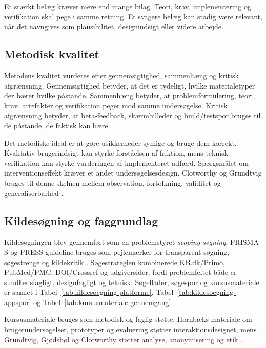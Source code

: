 Et stærkt belæg kræver mere end mange bilag. Teori, krav, implementering og verifikation skal pege i samme retning. Et svagere belæg kan stadig være relevant, når det navngives som plausibilitet, designindsigt eller videre arbejde.

\subsection{Metodisk kvalitet}

Metodens kvalitet vurderes efter gennemsigtighed, sammenhæng og kritisk afgrænsning. Gennemsigtighed betyder, at det er tydeligt, hvilke materialetyper der bærer hvilke påstande. Sammenhæng betyder, at problemformulering, teori, krav, artefakter og verifikation peger mod samme undersøgelse. Kritisk afgrænsning betyder, at beta-feedback, skærmbilleder og build/testspor bruges til de påstande, de faktisk kan bære.

Det metodiske ideal er at gøre usikkerheder synlige og bruge dem korrekt. Kvalitativ brugerindsigt kan styrke forståelsen af friktion, mens teknisk verifikation kan styrke vurderingen af implementeret adfærd. Spørgsmålet om interventionseffekt kræver et andet undersøgelsesdesign. Clotworthy og Grundtvig bruges til denne skelnen mellem observation, fortolkning, validitet og generaliserbarhed \cite{clotworthy2025_etik_kvalitet_forskning,grundtvig2025_analyse_data}.

\subsection{Kildesøgning og faggrundlag}

Kildesøgningen blev gennemført som en problemstyret \emph{scoping-søgning}. PRISMA-S og PRESS-guideline bruges som pejlemærker for transparent søgning, søgestrenge og kildekritik \cite{rethlefsen2021_prisma_s,mcgowan2016_press_guideline_statement}. Søgestrategien kombinerede KB.dk/Primo, PubMed/PMC, DOI/Crossref og udgiversider, fordi problemfeltet både er sundhedsfagligt, designfagligt og teknisk. Søgeflader, søgespor og kursusmateriale er samlet i Tabel~\ref{tab:kildesoegning-platforme}, Tabel~\ref{tab:kildesoegning-appspor} og Tabel~\ref{tab:kursusmateriale-gennemgang}.

Kursusmateriale bruges som metodisk og faglig støtte. Hornbæks materiale om brugerundersøgelser, prototyper og evaluering støtter interaktionsdesignet, mens Grundtvig, Gjødsbøl og Clotworthy støtter analyse, anonymisering og etik \cite{hornbaek2024_brugerundersoegelser,hornbaek2024_prototyper,hornbaek2024_evaluering,grundtvig2025_analyse_data,gjoedsboel_grundtvig2025_interview,clotworthy2025_etik_kvalitet_forskning}.

